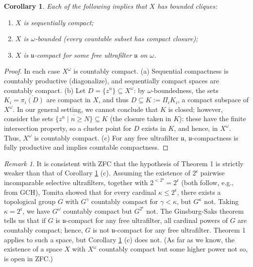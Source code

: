 \documentclass[12pt]{article}
\renewcommand{\u}{\mathfrak{u}}
\theoremstyle{plain}
\newtheorem{corollary}{Corollary}
\theoremstyle{definition}
\theoremstyle{remark}
\newtheorem{remark}{Remark}
\begin{document}
\begin{corollary}\label{suffconds}
Each of the following implies that $X$ has bounded cliques:
\begin{enumerate}
\item[(a)] $X$ is sequentially compact;
\item[(b)] $X$ is $\omega$-bounded (every countable subset has compact closure);
\item[(c)] $X$ is $\u$-compact for some free ultrafilter $\u$ on $\omega$.
\end{enumerate}
\end{corollary}

\begin{proof}
In each case $X^\omega$ is countably compact. (a) Sequential compactness is countably productive (diagonalize), and sequentially compact spaces are countably compact. (b) Let  $D = \{z^{n}\} \subseteq X^\omega$: by $\omega$-boundedness, the sets $K_i = \overline{\pi_{i}(D)}$ are compact in $X$, 
and thus $D \subseteq K:= \Pi_i K_i$, a compact 
subspace of $X^{\omega}$.  In our general setting, 
we cannot conclude that $K$ is closed; however, 
consider the sets $\overline{\{z^n \mid n \geq N\}} \subseteq K$ (the closure taken in $K$): these have the finite intersection property, so a cluster point for $D$ exists in $K$, and hence, in $X^{\omega}$. Thus, $X^{\omega}$ is countably compact. 
(c) For any free ultrafilter $\u$, $\u$-compactness is fully productive { \cite[Theorem 4.2]{Bern}} and implies countable compactness. 
\end{proof}



\begin{remark} 
It is consistent with ZFC that the hypothesis of Theorem 1 is strictly weaker than that of 
Corollary \ref{suffconds} (c).  Assuming the existence of $2^{\mathfrak c}$ pairwise incomparable selective ultrafilters, together with $2^{<2^{\mathfrak c}} = 2^{\mathfrak c}$ (both follow, e.g., from GCH), Tomita \cite{To}  showed that for every cardinal $\kappa \leq 2^{\mathfrak c}$, there exists a topological group $G$ with $G^{\gamma}$ countably compact for $\gamma < \kappa$, but $G^{\kappa}$ not. Taking $\kappa = 2^{\mathfrak c}$, we have $G^{\omega}$ countably compact but $G^{2^{\mathfrak c}}$ not. The 
Ginsburg-Saks theorem \cite{GS} tells us that 
if $G$ is $\u$-compact for any free ultrafilter, 
all cardinal powers of $G$ are countably compact; 
hence, $G$ is not $\u$-compact for any free ultrafilter. Theorem 1 applies to such a space, but Corollary \ref{suffconds} (c) does not. (As far as we know, the existence of a space $X$ with $X^{\omega}$ countably compact but 
some higher power not so, is open in ZFC.)
\end{remark} 
\end{document}
